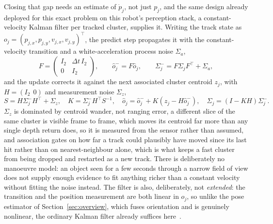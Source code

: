 \documentclass[11pt,a4paper]{article}
\begin{document}
Closing that gap needs an estimate of $\dot p_j$, not just $p_j$, and the same design already deployed for
this exact problem on this robot's perception stack, a constant-velocity Kalman filter per tracked cluster,
supplies it. Writing the track state as $o_j=(p_{j,x},p_{j,y},v_{j,x},v_{j,y})^{\!\top}$, the predict step
propagates it with the constant-velocity transition and a white-acceleration process noise $\Sigma_a$,
\begin{equation}
  F=\begin{pmatrix}I_2 & \Delta t\,I_2\\ 0 & I_2\end{pmatrix},\qquad
  \hat o_j^- = F\hat o_j,\qquad \Sigma_j^- = F\Sigma_jF^{\!\top}+\Sigma_a,
  \label{eq:kfpredict}
\end{equation}
and the update corrects it against the next associated cluster centroid $z_j$, with $H=(I_2\;\,0)$ and
measurement noise $\Sigma_z$,
\begin{equation}
  S=H\Sigma_j^-H^{\!\top}+\Sigma_z,\quad K=\Sigma_j^-H^{\!\top}S^{-1},\quad
  \hat o_j=\hat o_j^-+K(z_j-H\hat o_j^-),\quad \Sigma_j=(I-KH)\Sigma_j^-.
  \label{eq:kfupdate}
\end{equation}
$\Sigma_z$ is dominated by centroid wander, not ranging error, a different slice of the same cluster is
visible frame to frame, which moves its centroid far more than any single depth return does, so it is
measured from the sensor rather than assumed, and association gates on how far a track could plausibly have
moved since its last hit rather than on nearest-neighbour alone, which is what keeps a fast cluster from
being dropped and restarted as a new track. There is deliberately no manoeuvre model: an object seen for a
few seconds through a narrow field of view does not supply enough evidence to fit anything richer than a
constant velocity without fitting the noise instead. The filter is also, deliberately, not
\emph{extended}: the transition and the position measurement are both linear in $o_j$, so unlike the pose
estimator of Section~\ref{sec:overview}, which fuses orientation and is genuinely nonlinear, the ordinary
Kalman filter already suffices here~\cite{barshalom2001estimation}.
\end{document}
